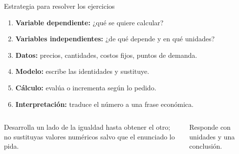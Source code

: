 \documentclass[aspectratio=169]{beamer}
\begin{document}
\begin{frame}{Estrategia para resolver los ejercicios}
  \small\vspace{-3pt}
  \begin{mwpasos}[Checklist]
    \begin{enumerate}
      \item \textbf{Variable dependiente:} ¿qué se quiere calcular?
      \item \textbf{Variables independientes:} ¿de qué depende y en qué unidades?
      \item \textbf{Datos:} precios, cantidades, costos fijos, puntos de demanda.
      \item \textbf{Modelo:} escribe las identidades y sustituye.
      \item \textbf{Cálculo:} evalúa o incrementa según lo pedido.
      \item \textbf{Interpretación:} traduce el número a una frase económica.
    \end{enumerate}
  \end{mwpasos}
  \begin{columns}[T]
    \begin{mwextra}
      Desarrolla un lado de la igualdad hasta obtener el otro; no sustituyas
      valores numéricos salvo que el enunciado lo pida.
    \end{mwextra}
    \begin{mwextra}
      Responde con unidades y una conclusión.
    \end{mwextra}
  \end{columns}
\end{frame}
\end{document}
